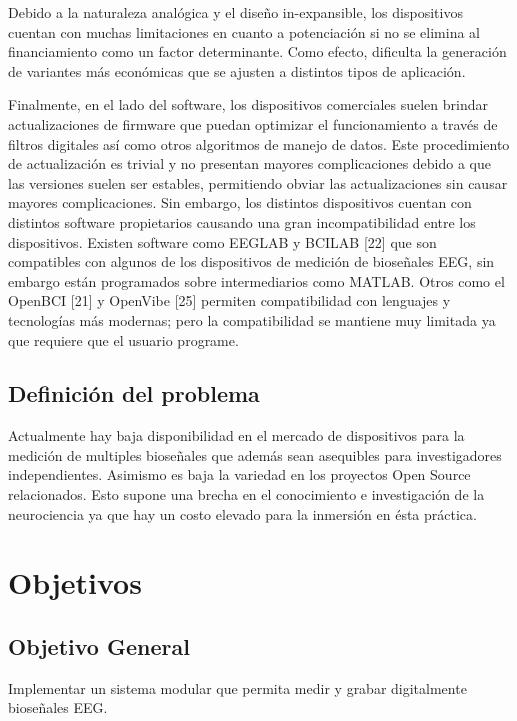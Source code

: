 \documentclass[11pt]{article}
\begin{document}
Debido a la naturaleza analógica y el diseño in-expansible, los dispositivos cuentan con muchas limitaciones en cuanto a potenciación si no se elimina al financiamiento como un factor determinante. Como efecto, dificulta la generación de variantes más económicas que se ajusten a distintos tipos de aplicación.

Finalmente, en el lado del software, los dispositivos comerciales suelen brindar actualizaciones de firmware que puedan optimizar el funcionamiento a través de filtros digitales así como otros algoritmos de manejo de datos. Este procedimiento de actualización es trivial y no presentan mayores complicaciones debido a que las versiones suelen ser estables, permitiendo obviar las actualizaciones sin causar mayores complicaciones. Sin embargo, los distintos dispositivos cuentan con distintos software propietarios causando una gran incompatibilidad entre los dispositivos. Existen software como EEGLAB y BCILAB [22] que son compatibles con algunos de los dispositivos de medición de bioseñales EEG, sin embargo están programados sobre intermediarios como MATLAB. Otros como el OpenBCI [21] y OpenVibe [25] permiten compatibilidad con lenguajes y tecnologías más modernas; pero la compatibilidad se mantiene muy limitada ya que requiere que el usuario programe.

\subsection{Definición del problema}
\label{sec:org28efe15}
Actualmente hay baja disponibilidad en el mercado de dispositivos para la medición de multiples bioseñales que además sean asequibles para investigadores independientes. Asimismo es baja la variedad en los proyectos Open Source relacionados. Esto supone una brecha en el conocimiento e investigación de la neurociencia ya que hay un costo elevado para la inmersión en ésta práctica.

\section{Objetivos}
\label{sec:org9ebadf0}
\subsection{Objetivo General}
\label{sec:org71916ea}
Implementar un sistema modular que permita medir y grabar digitalmente bioseñales EEG.
\end{document}
